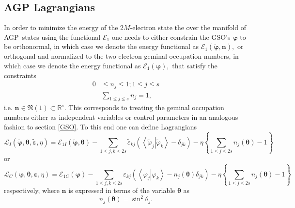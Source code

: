 \documentclass[aps,preprint]{revtex4}%
\begin{document}
\subsection{AGP Lagrangians\label{Lagran}}

In order to minimize the energy of the $2M$-electron state the over the
manifold of AGP\ states using the functional $\mathcal{E}_{1}$ one needs to
either constrain the GSO's $\boldsymbol{\varphi}$ to be orthonormal, in which
case we denote the energy functional as $\mathcal{E}_{1}\left(
\boldsymbol{\tilde{\varphi},n}\right)  ,$ or orthogonal and normalized to the
two electron geminal occupation numbers, in which case we denote the energy
functional as $\mathcal{E}_{1}\left(  \boldsymbol{\varphi}\right)  ,$ that
satisfy the constraints
\begin{align}
0  &  \leq n_{j}\leq1;1\leq j\leq s\nonumber\\
&  \sum_{1\leq j\leq s}n_{j}=1,
\end{align}
i.e. $\boldsymbol{n\in}\mathfrak{N}\left(  1\right)  \subset\mathbb{R}^{s}.$
This corresponds to treating the geminal occupation numbers either as
independent variables or control parameters in an analogous fashion to section
\ref{GSO}. To this end one can define Lagrangians
\begin{equation}
\mathcal{L}_{I}\left(  \boldsymbol{\tilde{\varphi},\theta},\boldsymbol{\tilde
{\varepsilon},}\eta\right)  =\mathcal{E}_{1I}\left(  \boldsymbol{\tilde
{\varphi},\boldsymbol{\theta}}\right)  -\sum_{1\leq j,k\leq2s}\tilde
{\varepsilon}_{kj}\left(  \left\langle \left.  \tilde{\varphi}_{j}\right\vert
\tilde{\varphi}_{k}\right\rangle -\delta_{jk}\right)  -\eta\left\{
\sum_{1\leq j\leq2s}n_{j}\boldsymbol{\left(  \boldsymbol{\theta}\right)
}-1\right\}  \label{LI1}%
\end{equation}
or%
\begin{equation}
\mathcal{L}_{C}\left(  \boldsymbol{\varphi,\theta},\boldsymbol{\varepsilon
,}\eta\right)  =\mathcal{E}_{1C}\left(  \boldsymbol{\varphi}\right)
-\sum_{1\leq j,k\leq2s}\varepsilon_{kj}\left(  \left\langle \left.
\varphi_{j}\right\vert \varphi_{k}\right\rangle -n_{j}\boldsymbol{\left(
\boldsymbol{\theta}\right)  }\delta_{jk}\right)  -\eta\left\{  \sum_{1\leq
j\leq2s}n_{j}\boldsymbol{\left(  \boldsymbol{\theta}\right)  }-1\right\}
\label{LI2}%
\end{equation}
respectively, where $\boldsymbol{n}$ is expressed in terms of the variable
$\boldsymbol{\theta}$ as
\begin{equation}
n_{j}\boldsymbol{\left(  \boldsymbol{\theta}\right)  }=\sin^{2}\theta_{j}.
\end{equation}
\end{document}
